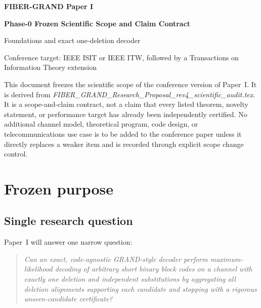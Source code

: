 \documentclass[11pt]{article}
\theoremstyle{definition}
\theoremstyle{remark}
\begin{document}
\begin{center}
{\sffamily\bfseries\color{navy}\fontsize{25}{29}\selectfont FIBER-GRAND Paper I}\par
\vspace{0.12in}
{\sffamily\bfseries\color{blue}\fontsize{17}{21}\selectfont Phase-0 Frozen Scientific Scope and Claim Contract}\par
\vspace{0.18in}
{\large Foundations and exact one-deletion decoder}\par
\vspace{0.15in}
{\small Conference target: IEEE ISIT or IEEE ITW, followed by a Transactions on Information Theory extension}\par
\end{center}

\begin{freezebox}
This document freezes the scientific scope of the conference version of Paper~I. It is derived from
\emph{FIBER\_GRAND\_Research\_Proposal\_rev4\_scientific\_audit.tex}. It is a scope-and-claim contract, not a claim that every listed theorem, novelty statement, or performance target has already been independently certified. No additional channel model, theoretical program, code design, or telecommunications use case is to be added to the conference paper unless it directly replaces a weaker item and is recorded through explicit scope change control.
\end{freezebox}

\tableofcontents
\clearpage

\section{Frozen purpose}

\subsection{Single research question}

Paper~I will answer one narrow question:

\begin{quote}
\emph{Can an exact, code-agnostic GRAND-style decoder perform maximum-likelihood decoding of arbitrary short binary block codes on a channel with exactly one deletion and independent substitutions by aggregating all deletion alignments supporting each candidate and stopping with a rigorous unseen-candidate certificate?}
\end{quote}
\end{document}
